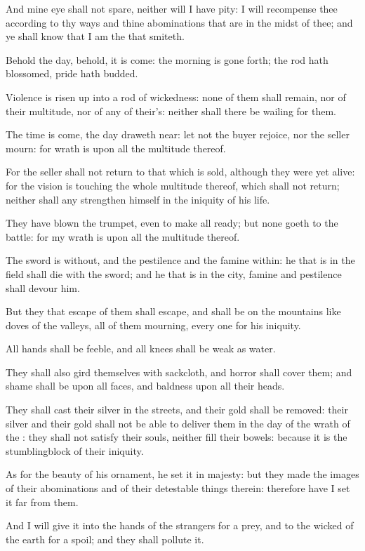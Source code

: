 \Verse And mine eye shall not spare, neither will I have pity: I will recompense thee according to thy ways and thine abominations that are in the midst of thee; and ye shall know that I am the \LORD that smiteth.

\Verse Behold the day, behold, it is come: the morning is gone forth; the rod hath blossomed, pride hath budded.

\Verse Violence is risen up into a rod of wickedness: none of them shall remain, nor of their multitude, nor of any of their's: neither shall there be wailing for them.

\Verse The time is come, the day draweth near: let not the buyer rejoice, nor the seller mourn: for wrath is upon all the multitude thereof.

\Verse For the seller shall not return to that which is sold, although they were yet alive: for the vision is touching the whole multitude thereof, which shall not return; neither shall any strengthen himself in the iniquity of his life.

\Verse They have blown the trumpet, even to make all ready; but none goeth to the battle: for my wrath is upon all the multitude thereof.

\Verse The sword is without, and the pestilence and the famine within: he that is in the field shall die with the sword; and he that is in the city, famine and pestilence shall devour him.

\Verse But they that escape of them shall escape, and shall be on the mountains like doves of the valleys, all of them mourning, every one for his iniquity.

\Verse All hands shall be feeble, and all knees shall be weak as water.

\Verse They shall also gird themselves with sackcloth, and horror shall cover them; and shame shall be upon all faces, and baldness upon all their heads.

\Verse They shall cast their silver in the streets, and their gold shall be removed: their silver and their gold shall not be able to deliver them in the day of the wrath of the \LORD: they shall not satisfy their souls, neither fill their bowels: because it is the stumblingblock of their iniquity.

\Verse As for the beauty of his ornament, he set it in majesty: but they made the images of their abominations and of their detestable things therein: therefore have I set it far from them.

\Verse And I will give it into the hands of the strangers for a prey, and to the wicked of the earth for a spoil; and they shall pollute it.

